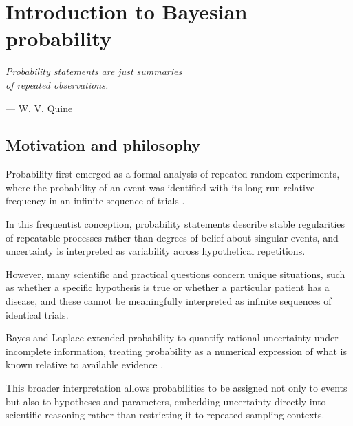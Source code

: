 
\chapter{Introduction to Bayesian probability}
\label{chapter6}

\epigraph{\textit{Probability statements are just summaries\\of repeated observations.}}{— W. V. Quine}


\section{Motivation and philosophy}

Probability first emerged as a formal analysis of repeated random experiments, where the probability of an event was identified with its long-run relative frequency in an infinite sequence of trials \cite{bernoulli_1713_ars}. 

\medskip

In this frequentist conception, probability statements describe stable regularities of repeatable processes rather than degrees of belief about singular events, and uncertainty is interpreted as variability across hypothetical repetitions. 

\medskip

However, many scientific and practical questions concern unique situations, such as whether a specific hypothesis is true or whether a particular patient has a disease, and these cannot be meaningfully interpreted as infinite sequences of identical trials. 

\medskip

Bayes and Laplace extended probability to quantify rational uncertainty under incomplete information, treating probability as a numerical expression of what is known relative to available evidence \cite{bayes_1763_doctrine,laplace_1812_theorie}. 

\medskip

This broader interpretation allows probabilities to be assigned not only to events but also to hypotheses and parameters, embedding uncertainty directly into scientific reasoning rather than restricting it to repeated sampling contexts. 

